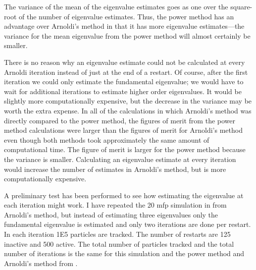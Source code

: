 The variance of the mean of the eigenvalue estimates goes as one over the square-root of the number of eigenvalue estimates.  Thus, the power method has an advantage over Arnoldi's method in that it has more eigenvalue estimates---the variance for the mean eigenvalue from the power method will almost certainly be smaller.  

There is no reason why an eigenvalue estimate could not be calculated at every Arnoldi iteration instead of just at the end of a restart.  Of course, after the first iteration we could only estimate the fundamental eigenvalue; we would have to wait for additional iterations to estimate higher order eigenvalues.  It would be slightly more computationally expensive, but the decrease in the variance may be worth the extra expense.  In all of the calculations in which Arnoldi's method was directly compared to the power method, the figures of merit from the power method calculations were larger than the figures of merit for Arnoldi's method even though both methods took approximately the same amount of computational time.  The figure of merit is larger for the power method because the variance is smaller.  Calculating an eigenvalue estimate at every iteration would increase the number of estimates in Arnoldi's method, but is more computationally expensive.

A preliminary test has been performed to see how estimating the eigenvalue at each iteration might work.  I have repeated the 20 mfp simulation in  from Arnoldi's method, but instead of estimating three eigenvalues only the fundamental eigenvalue is estimated and only two iterations are done per restart.  In each iteration 1E5 particles are tracked.  The number of restarts are 125 inactive and 500 active.  The total number of particles tracked and the total number of iterations is the same for this simulation and the power method and Arnoldi's method from .


